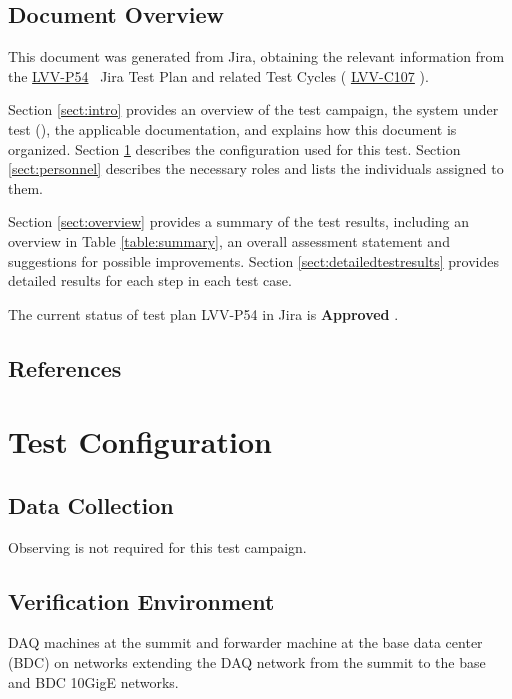\documentclass[DM,lsstdraft,STR,toc]{lsstdoc}
\begin{document}
\subsection{Document Overview}
\label{sect:docoverview}

This document was generated from Jira, obtaining the relevant information from the 
\href{https://jira.lsstcorp.org/secure/Tests.jspa#/testPlan/LVV-P54}{LVV-P54}
~Jira Test Plan and related Test Cycles (
  \href{https://jira.lsstcorp.org/secure/Tests.jspa#/testCycle/LVV-C107}{LVV-C107}
).

Section \ref{sect:intro} provides an overview of the test campaign, the system under test (\product{}), the applicable documentation, and explains how this document is organized.
Section \ref{sect:configuration}  describes the configuration used for this test.
Section \ref{sect:personnel} describes the necessary roles and lists the individuals assigned to them.

Section \ref{sect:overview} provides a summary of the test results, including an overview in Table \ref{table:summary}, an overall assessment statement and suggestions for possible improvements.
Section \ref{sect:detailedtestresults} provides detailed results for each step in each test case.

The current status of test plan LVV-P54 in Jira is \textbf{ Approved }.

\subsection{References}
\label{sect:references}
\renewcommand{\refname}{}

\section{Test Configuration}
\label{sect:configuration}

\subsection{Data Collection}

  Observing is not required for this test campaign.

\subsection{Verification Environment}
\label{sect:hwconf}
  DAQ machines at the summit and forwarder machine at the base data center
(BDC) on networks extending the DAQ network from the summit to the base
and BDC 10GigE networks. ~
\end{document}
